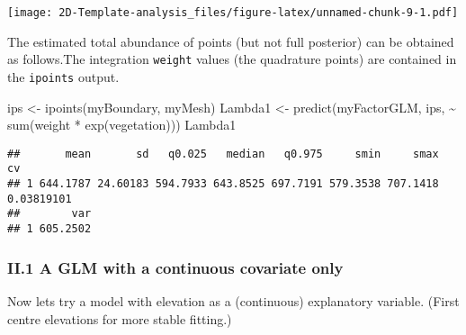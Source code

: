 \documentclass[
]{article}
\newenvironment{Shaded}{\begin{snugshade}}{\end{snugshade}}
\newcommand{\AttributeTok}[1]{\textcolor[rgb]{0.77,0.63,0.00}{#1}}
\newcommand{\ConstantTok}[1]{\textcolor[rgb]{0.00,0.00,0.00}{#1}}
\newcommand{\DecValTok}[1]{\textcolor[rgb]{0.00,0.00,0.81}{#1}}
\newcommand{\FunctionTok}[1]{\textcolor[rgb]{0.00,0.00,0.00}{#1}}
\newcommand{\NormalTok}[1]{#1}
\newcommand{\OtherTok}[1]{\textcolor[rgb]{0.56,0.35,0.01}{#1}}
\newcommand{\SpecialCharTok}[1]{\textcolor[rgb]{0.00,0.00,0.00}{#1}}
\begin{document}
\texttt{[image: 2D-Template-analysis\_files/figure-latex/unnamed-chunk-9-1.pdf]}

The estimated total abundance of points (but not full posterior) can be
obtained as follows.The integration \texttt{weight} values (the
quadrature points) are contained in the \texttt{ipoints} output.

\begin{Shaded}
\begin{Highlighting}[]
\NormalTok{ips }\OtherTok{\textless{}{-}} \FunctionTok{ipoints}\NormalTok{(myBoundary, myMesh)}
\NormalTok{Lambda1 }\OtherTok{\textless{}{-}} \FunctionTok{predict}\NormalTok{(myFactorGLM, ips, }\SpecialCharTok{\textasciitilde{}} \FunctionTok{sum}\NormalTok{(weight }\SpecialCharTok{*} \FunctionTok{exp}\NormalTok{(vegetation)))}
\NormalTok{Lambda1}
\end{Highlighting}
\end{Shaded}

\begin{verbatim}
##       mean       sd   q0.025   median   q0.975     smin     smax         cv
## 1 644.1787 24.60183 594.7933 643.8525 697.7191 579.3538 707.1418 0.03819101
##        var
## 1 605.2502
\end{verbatim}

\hypertarget{ii.1-a-glm-with-a-continuous-covariate-only}{%
\subsubsection{II.1 A GLM with a continuous covariate
only}\label{ii.1-a-glm-with-a-continuous-covariate-only}}

Now lets try a model with elevation as a (continuous) explanatory
variable. (First centre elevations for more stable fitting.)

\begin{Shaded}
\end{Shaded}
\end{document}
